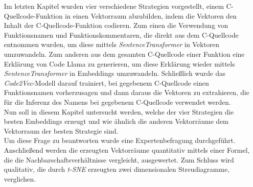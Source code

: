 \documentclass[12pt,letterpaper,ngerman]{article}
\begin{document}
Im letzten Kapitel wurden vier verschiedene Strategien vorgestellt,
einem C-Quellcode-Funktion in einen Vektorraum abzubilden, indem 
die Vektoren den Inhalt der C-Quellcode-Funktion codieren.
Zum einen die Verwendung von Funktionsnamen und Funktionskommentaren,
die direkt aus dem C-Quellcode entnommen wurden, um diese mittels
\textit{SentenceTransformer} in Vektoren umzuwandeln. Zum anderen
aus dem gesamten C-Quellcode einer
Funktion eine Erklärung von Code Llama zu generieren, um diese 
Erklärung wieder mittels \textit{SentenceTransformer} in Embeddings
umzuwandeln. Schließlich wurde das \textit{Code2Vec}-Modell darauf 
trainiert,
bei gegebenem C-Quellcode einen Funktionsnamen vorherzusagen und dann
daraus die Vektoren zu extrahieren, die für die Inferenz des Namens
bei gegebenem C-Quellcode verwendet werden.\\
Nun soll in diesem Kapitel untersucht werden, welche der vier 
Strategien
die besten Embeddings erzeugt und wie ähnlich die anderen 
Vektorräume dem Vektorraum der besten Strategie
sind.\\
Um diese Frage zu beantworten wurde eine Expertenbefragung 
durchgeführt. Anschließend werden die erzeugten Vektorräume 
quantitativ
mittels einer Formel, die die Nachbarschaftsverhältnisse vergleicht, 
ausgewertet.
Zum Schluss wird qualitativ, die durch \textit{t-SNE} erzeugten
zwei dimensionalen Streudiagramme, verglichen.
\end{document}
